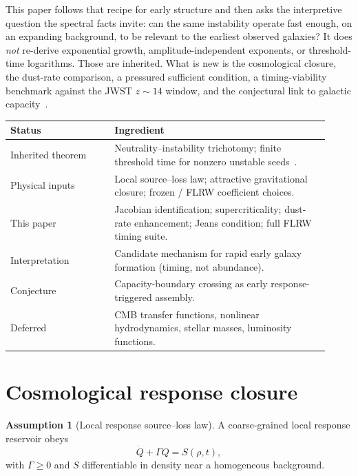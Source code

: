 \documentclass[11pt]{article}
\theoremstyle{definition}
\newtheorem{assumption}[theorem]{Assumption}
\theoremstyle{remark}
\begin{document}
This paper follows that recipe for early structure and then asks the interpretive question the spectral facts invite: can the same instability operate fast enough, on an expanding background, to be relevant to the earliest observed galaxies?
It does \emph{not} re-derive exponential growth, amplitude-independent exponents, or threshold-time logarithms.
Those are inherited.
What is new is the cosmological closure, the dust-rate comparison, a pressured sufficient condition, a timing-viability benchmark against the JWST $z\sim14$ window, and the conjectural link to galactic capacity~\cite{boyd2026galactic}.

\begin{center}
\small
\begin{tabular}{@{}p{0.30\linewidth}p{0.62\linewidth}@{}}
\toprule
\textbf{Status} & \textbf{Ingredient}\\
\midrule
Inherited theorem & Neutrality--instability trichotomy; finite threshold time for nonzero unstable seeds~\cite{boyd2026response}.\\
Physical inputs & Local source--loss law; attractive gravitational closure; frozen / FLRW coefficient choices.\\
This paper & Jacobian identification; supercriticality; dust-rate enhancement; Jeans condition; full FLRW timing suite.\\
Interpretation & Candidate mechanism for rapid early galaxy formation (timing, not abundance).\\
Conjecture & Capacity-boundary crossing as early response-triggered assembly.\\
Deferred & CMB transfer functions, nonlinear hydrodynamics, stellar masses, luminosity functions.\\
\bottomrule
\end{tabular}
\end{center}

\section{Cosmological response closure}
\label{sec:closure}
\begin{assumption}[Local response source--loss law]
\label{ass:sourceloss}
A coarse-grained local response reservoir obeys
\begin{equation}
\dot Q+\Gamma Q=S(\rho,t),
\end{equation}
with $\Gamma\ge0$ and $S$ differentiable in density near a homogeneous background.
\end{assumption}
\end{document}
